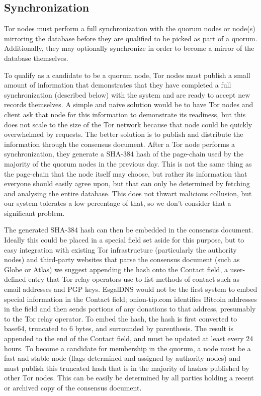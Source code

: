 \subsection{Synchronization}

Tor nodes must perform a full synchronization with the quorum nodes or node(s) mirroring the database before they are qualified to be picked as part of a quorum. Additionally, they may optionally synchronize in order to become a mirror of the database themselves.

To qualify as a candidate to be a quorum node, Tor nodes must publish a small amount of information that demonstrates that they have completed a full synchronization (described below) with the system and are ready to accept new records themselves. A simple and naive solution would be to have Tor nodes and client ask that node for this information to demonstrate its readiness, but this does not scale to the size of the Tor network because that node could be quickly overwhelmed by requests. The better solution is to publish and distribute the information through the consensus document. After a Tor node performs a synchronization, they generate a SHA-384 hash of the page-chain used by the majority of the quorum nodes in the previous day. This is not the same thing as the page-chain that the node itself may choose, but rather its information that everyone should easily agree upon, but that can only be determined by fetching and analysing the entire database. This does not thwart malicious collusion, but our system tolerates a low percentage of that, so we don't consider that a significant problem.

The generated SHA-384 hash can then be embedded in the consensus document. Ideally this could be placed in a special field set aside for this purpose, but to easy integration with existing Tor infrastructure (particularly the authority nodes) and third-party websites that parse the consensus document (such as Globe or Atlas) we suggest appending the hash onto the Contact field, a user-defined entry that Tor relay operators use to list methods of contact such as email addresses and PGP keys. EsgalDNS would not be the first system to embed special information in the Contact field; onion-tip.com identifies Bitcoin addresses in the field and then sends portions of any donations to that address, presumably to the Tor relay operator. To embed the hash, the hash is first converted to base64, truncated to 6 bytes, and surrounded by parenthesis. The result is appended to the end of the Contact field, and must be updated at least every 24 hours. To become a candidate for membership in the quorum, a node must be a fast and stable node (flags determined and assigned by authority nodes) and must publish this truncated hash that is in the majority of hashes published by other Tor nodes. This can be easily be determined by all parties holding a recent or archived copy of the consensus document.

